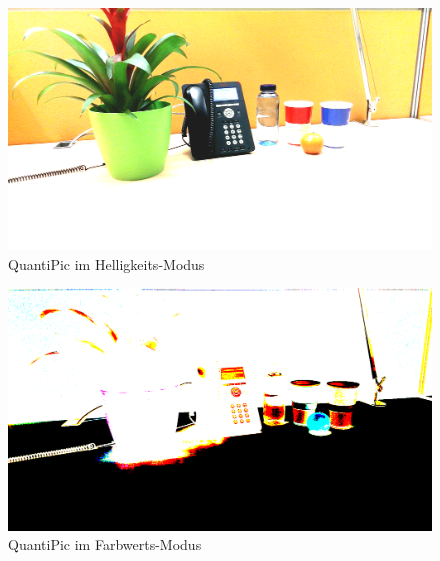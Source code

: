 \begin{landscape}
\begin{figure}[h]
	\centering
		\includegraphics[width=1.4\textwidth]{img/Fotos/QuantiPic_Helligkeit.png}
	\caption[QuantiPic Helligkeit]{QuantiPic im Helligkeits-Modus}
	\label{fig:quanti_hell}
\end{figure}

\begin{figure}[h]
	\centering
		\includegraphics[width=1.4\textwidth]{img/Fotos/QuantiPic_Farbwerte.png}
	\caption[QuantiPic Farbwerte]{QuantiPic im Farbwerts-Modus}
	\label{fig:quanti_farb}
\end{figure}





\end{landscape} 

%
%
%


